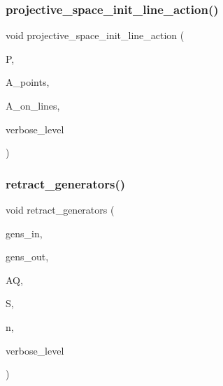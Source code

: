 \mbox{\label{action__global_8_c_abcb64d4224e95ccdc2460145af908a74}} 
\subsubsection{\texorpdfstring{projective\+\_\+space\+\_\+init\+\_\+line\+\_\+action()}{projective\_space\_init\_line\_action()}}
{\footnotesize\ttfamily void projective\+\_\+space\+\_\+init\+\_\+line\+\_\+action (\begin{DoxyParamCaption}\item[{\mbox{\hyperlink{classprojective__space}{projective\+\_\+space}} $\ast$}]{P,  }\item[{\mbox{\hyperlink{classaction}{action}} $\ast$}]{A\+\_\+points,  }\item[{\mbox{\hyperlink{classaction}{action}} $\ast$\&}]{A\+\_\+on\+\_\+lines,  }\item[{\mbox{\hyperlink{galois_8h_a09fddde158a3a20bd2dcadb609de11dc}{I\+NT}}}]{verbose\+\_\+level }\end{DoxyParamCaption})}

\mbox{\label{action__global_8_c_a11d44ee5d2c12ff2fe26620531317408}} 
\subsubsection{\texorpdfstring{retract\+\_\+generators()}{retract\_generators()}}
{\footnotesize\ttfamily void retract\+\_\+generators (\begin{DoxyParamCaption}\item[{\mbox{\hyperlink{classvector__ge}{vector\+\_\+ge}} $\ast$}]{gens\+\_\+in,  }\item[{\mbox{\hyperlink{classvector__ge}{vector\+\_\+ge}} $\ast$\&}]{gens\+\_\+out,  }\item[{\mbox{\hyperlink{classaction}{action}} $\ast$}]{AQ,  }\item[{\mbox{\hyperlink{classsubfield__structure}{subfield\+\_\+structure}} $\ast$}]{S,  }\item[{\mbox{\hyperlink{galois_8h_a09fddde158a3a20bd2dcadb609de11dc}{I\+NT}}}]{n,  }\item[{\mbox{\hyperlink{galois_8h_a09fddde158a3a20bd2dcadb609de11dc}{I\+NT}}}]{verbose\+\_\+level }\end{DoxyParamCaption})}

